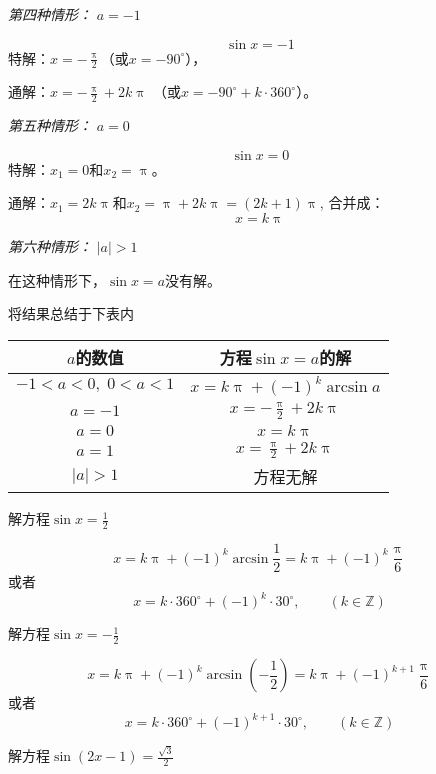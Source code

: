 \emph{第四种情形：} $a=-1$

\[\sin x=-1\]
特解：$x=-\frac{\uppi}{2}$（或$x=-90^{\circ}$），

通解：$x=-\frac{\uppi}{2}+2k\uppi$ （或$x=-90^{\circ}+k\cdot 360^{\circ}$）。

\emph{第五种情形：} $a=0$

\[\sin x=0\]
特解：$x_1=0$和$x_2=\uppi$。

通解：$x_1=2k\uppi$和$x_2=\uppi +2k\uppi =(2k+1)\uppi$,
合并成：\[x=k\uppi\]

\emph{第六种情形：} $|a|>1$

在这种情形下，$\sin x=a$没有解。

将结果总结于下表内
\begin{center}
\begin{tabular}{c|c}
    \hline
$a$的数值& 方程$\sin x=a$的解\\
    \hline
$-1<a<0,\; 0<a<1$ & $x=k\uppi +(-1)^k\arcsin a$\\
$a=-1$& $x=-\frac{\uppi}{2}+2k\uppi$\\
$a=0$&   $x=k\uppi$\\
$a=1$& $x=\frac{\uppi}{2}+2k\uppi$\\
$|a|>1$ & 方程无解\\
    \hline
\end{tabular}   
\end{center}

\begin{example}
    解方程$\sin x=\frac{1}{2} $
\end{example}

\begin{solution}
    \[x=k\uppi+(-1)^k\arcsin\frac{1}{2}=k\uppi+(-1)^k\frac{\uppi}{6}\]
    或者\[x=k\cdot 360^{\circ}+(-1)^k\cdot 30^{\circ},\qquad (k\in\mathbb{Z})\]
\end{solution}


\begin{example}
    解方程$\sin x=-\frac{1}{2} $
\end{example}

\begin{solution}
\[x=k\uppi+(-1)^k\arcsin\left(-\frac{1}{2}\right)=k\uppi+(-1)^{k+1}\frac{\uppi}{6}\]
    或者\[x=k\cdot 360^{\circ}+(-1)^{k+1}\cdot  30^{\circ},\qquad (k\in\mathbb{Z})\]
\end{solution}


\begin{example}
    解方程$\sin (2x-1)=\frac{\sqrt{3}}{2} $
\end{example}

